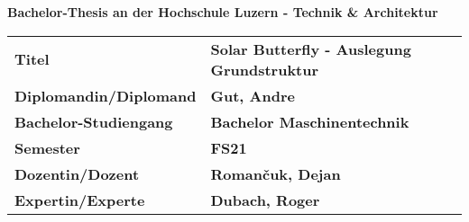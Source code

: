 \vspace{2cm}
\begin{large}
\textbf{Bachelor-Thesis an der Hochschule Luzern - Technik \& Architektur}\\
\end{large}
\vspace{1cm}

\begin{table}[H]
\small
  \begin{tabularx}{\linewidth}{llX}
    \textbf{Titel}                 & \textbf{Solar Butterfly - Auslegung Grundstruktur} &\\[4 mm]
    \textbf{Diplomandin/Diplomand} & \textbf{Gut, Andre}                                &\\[4 mm]
    \textbf{Bachelor-Studiengang}  & \textbf{Bachelor Maschinentechnik}                 &\\[4 mm]
    \textbf{Semester}              & \textbf{FS21}                                      &\\[4 mm]
    \textbf{Dozentin/Dozent}       & \textbf{Roman\v{c}uk, Dejan}                       &\\[4 mm]
    \textbf{Expertin/Experte}      & \textbf{Dubach, Roger}                             &
  \end{tabularx}
\end{table}

\vspace{1.5cm}
